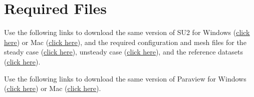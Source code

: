 \section*{Required Files}
\begin{su2note}
	Use the following links to download the same version of SU2 for Windows (\href{https://users.encs.concordia.ca/~bvermeir/book/executables/windows/SU2_Windows.zip}{\underline{click here}}) or Mac (\href{https://users.encs.concordia.ca/~bvermeir/book/executables/osx/SU2_Mac.zip}{\underline{click here}}), and the required configuration and mesh files for the steady case (\href{https://gitlab.com/bvermeir/book-cfd/blob/master/tutorial/tut4_laminar_cylinder/cylinder_steady.zip}{\underline{click here}}), unsteady case (\href{https://gitlab.com/bvermeir/book-cfd/blob/master/tutorial/tut4_laminar_cylinder/cylinder_unsteady.zip}{\underline{click here}}), and the reference datasets (\href{https://gitlab.com/bvermeir/book-cfd/blob/master/tutorial/tut4_laminar_cylinder/experimental_values.zip}{\underline{click here}}).
\end{su2note}
\begin{paraviewnote}
	Use the following links to download the same version of Paraview for Windows (\href{https://users.encs.concordia.ca/~bvermeir/book/executables/windows/ParaView-5.4.0-Qt5-OpenGL2-Windows-64bit.exe}{\underline{click here}}) or Mac (\href{https://users.encs.concordia.ca/~bvermeir/book/executables/osx/ParaView-5.4.0-Qt5-OpenGL2-MPI-OSX10.8-64bit.dmg}{\underline{click here}}).
\end{paraviewnote}

